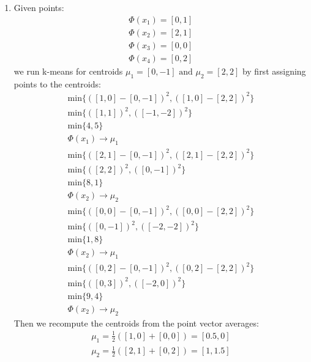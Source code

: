 \documentclass[12pt]{article}
\begin{document}
	\begin{enumerate}[label=(\alph*)]
		\item Given points:
			\begin{gather*}
				\Phi(x_1) = [0, 1] \\
				\Phi(x_2) = [2, 1] \\
				\Phi(x_3) = [0, 0] \\
				\Phi(x_4) = [0, 2]
			\end{gather*}
			we run k-means for centroids
			\(\mu_1 = [0, -1] \text{ and } \mu_2 = [2, 2]\)
			by first assigning points to the centroids:
			\begin{gather*}
				\text{min} \{ ( [1,0] - [0, -1] )^2, ( [1,0] - [2, 2] )^2\} \\
				\text{min} \{ ( [1,1] )^2, ( [-1, -2] )^2\} \\
				\text{min} \{ 4, 5\} \\
				\Phi(x_1) \rightarrow \mu_1
			\end{gather*}
			\begin{gather*}
				\text{min} \{ ( [2,1] - [0, -1] )^2, ( [2,1] - [2, 2] )^2\} \\
				\text{min} \{ ( [2,2] )^2, ( [0, -1] )^2\} \\
				\text{min} \{ 8, 1\} \\
				\Phi(x_2) \rightarrow \mu_2
			\end{gather*}
			\begin{gather*}
				\text{min} \{ ( [0,0] - [0, -1] )^2, ( [0,0] - [2, 2] )^2\} \\
				\text{min} \{ ( [0,-1] )^2, ( [-2, -2] )^2\} \\
				\text{min} \{ 1, 8\} \\
				\Phi(x_2) \rightarrow \mu_1
			\end{gather*}
			\begin{gather*}
				\text{min} \{ ( [0,2] - [0, -1] )^2, ( [0,2] - [2, 2] )^2\} \\
				\text{min} \{ ( [0,3] )^2, ( [-2, 0] )^2\} \\
				\text{min} \{ 9, 4\} \\
				\Phi(x_2) \rightarrow \mu_2
			\end{gather*}
			Then we recompute the centroids from the point vector averages:
			\begin{gather*}
				\mu_1 = \frac{1}{2} ( [1,0] + [0, 0] ) =  [0.5, 0] \\
				\mu_2 = \frac{1}{2} ( [2,1] + [0, 2] ) =  [1, 1.5] \\
			\end{gather*}

\end{enumerate}
\end{document}

